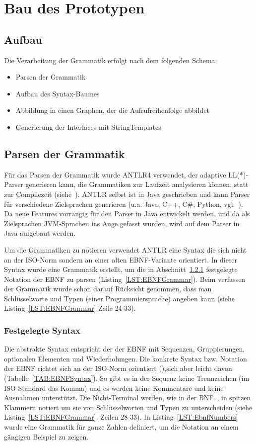 \documentclass[../InterneDSLs.tex]{subfiles}
\begin{document}
\chapter{Bau des Prototypen}\label{SEC:Prototype}

\section{Aufbau}
Die Verarbeitung der Grammatik erfolgt nach dem folgenden Schema:
\begin{itemize}
	\item Parsen der Grammatik
	\item Aufbau des Syntax-Baumes
	\item Abbildung in einen Graphen, der die Aufrufreihenfolge abbildet
	\item Generierung der Interfaces mit StringTemplates
\end{itemize}

\section{Parsen der Grammatik}
Für das Parsen der Grammatik wurde ANTLR4 verwendet, der adaptive LL(*)-Parser generieren kann, die Grammatiken zur Laufzeit analysieren können, statt zur Compilezeit (siehe~\cite[S. xiii ff]{Parr.2012}). ANTLR selbst ist in Java geschrieben und kann Parser für verschiedene Zielsprachen generieren (u.a. Java, C++, C\#, Python, vgl.~\cite{antlrcodegeneration.github}). Da neue Features vorrangig für den Parser in Java entwickelt werden, und da als Zielsprachen JVM-Sprachen ins Auge gefasst wurden, wird auf dem Parser in Java aufgebaut werden.

Um die Grammatiken zu notieren verwendet ANTLR eine Syntax die sich nicht an der ISO-Norm sondern an einer alten EBNF-Variante orientiert. In dieser Syntax wurde eine Grammatik erstellt, um die in Abschnitt~\ref{SEC:SetSyntax} festgelegte Notation der EBNF zu parsen (Listing~\ref{LST:EBNFGrammar}). Beim verfassen der Grammatik wurde schon darauf Rücksicht genommen, dass man Schlüsselworte und Typen (einer Programmiersprache) angeben kann (siehe Listing~\ref{LST:EBNFGrammar} Zeile 24-33).

\subsection{Festgelegte Syntax}\label{SEC:SetSyntax}
Die abstrakte Syntax entspricht der der EBNF mit Sequenzen, Gruppierungen, optionalen Elementen und Wiederholungen. Die konkrete Syntax bzw. Notation der EBNF richtet sich an der ISO-Norm orientiert (\cite[S. 7]{scowen1996international}),sich aber leicht davon (Tabelle~\ref{TAB:EBNFSyntax}). So gibt es in der Sequenz keine Trennzeichen (im ISO-Standard das Komma) und es werden keine Kommentare und keine Ausnahmen unterstützt. Die Nicht-Terminal werden, wie in der BNF~\cite[S. 3]{crocker1997augmented}, in spitzen Klammern notiert um sie von Schlüsselworten und Typen zu unterscheiden (siehe Listing~\ref{LST:EBNFGrammar}, Zeilen 28-33). In Listing~\ref{LST:EbnfNumbers} wurde eine Grammatik für ganze Zahlen definiert, um die Notation an einem gängigen Beispiel zu zeigen.
\end{document}
